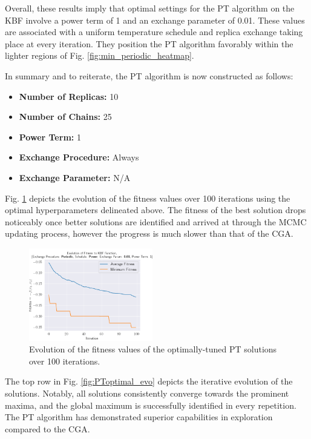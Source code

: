 \documentclass[10pt]{article}
\begin{document}
\begin{multicols}{2}
Overall, these results imply that optimal settings for the PT algorithm on the KBF involve a power term of 1 and an exchange parameter of 0.01. These values are associated with a uniform temperature schedule and replica exchange taking place at every iteration. They position the PT algorithm favorably within the lighter regions of Fig. \ref{fig:min_periodic_heatmap}.

\columnbreak

In summary and to reiterate, the PT algorithm is now constructed as follows:

\begin{itemize}
    \item \textbf{Number of Replicas:} 10
    \item \textbf{Number of Chains:} 25
    \item \textbf{Power Term:} 1
    \item \textbf{Exchange Procedure:} Always
    \item \textbf{Exchange Parameter:} N/A
\end{itemize}

Fig. \ref{fig:PToptimal_fitness} depicts the evolution of the fitness values over 100 iterations using the optimal hyperparameters delineated above. The fitness of the best solution drops noticeably once better solutions are identified and arrived at through the MCMC updating process, however the progress is much slower than that of the CGA.

\begin{figure}[H]
    \centering
    \includegraphics[width=0.48\textwidth]{../figures/Permanent Images/0.01_1_Periodic_Fitness.png}
    \captionsetup{justification=centering}
    \caption{Evolution of the fitness values of the optimally-tuned PT solutions over 100 iterations.}
    \label{fig:PToptimal_fitness}
\end{figure}

The top row in Fig. \ref{fig:PToptimal_evo} depicts the iterative evolution of the solutions. Notably, all solutions consistently converge towards the prominent maxima, and the global maximum is successfully identified in every repetition. The PT algorithm has demonstrated superior capabilities in exploration compared to the CGA.


\end{multicols}
\end{document}
